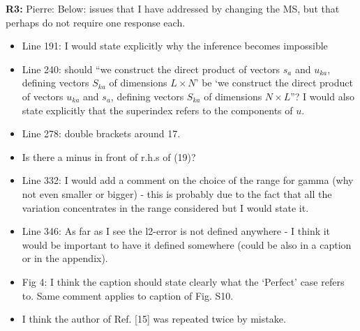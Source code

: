 \documentclass[aps,rmp,onecolumn]{revtex4-1}
\newcommand{\pierre}[1]{{\color{red}Pierre: #1}}
\newcommand{\refc}[1]{\textbf{R3:} #1\vskip 5mm}
\begin{document}
\refc{
	\pierre{Below: issues that I have addressed by changing the MS, but that perhaps do not require one response each.}
	\begin{itemize}
		\item Line 191: I would state explicitly why the inference becomes impossible
		\item Line 240: should ``we construct the direct product of vectors $s_{a}$ and $u_{ka}$, defining vectors $S_{ka}$ of dimensions $L \times N$’ be ‘we construct the direct product of vectors $u_{ka}$ and $s_{a}$, defining vectors $S_{ka}$ of dimensions $N \times L$''?
		I would also state explicitly that the superindex refers to the components of $u$.
		\item Line 278: double brackets around 17.
		\item Is there a minus in front of r.h.s of (19)?
		\item Line 332: I would add a comment on the choice of the range for gamma (why not even smaller or bigger) - this is probably due to the fact that all the variation concentrates in the range considered but I would state it.
		\item Line 346: As far as I see the l2-error is not defined anywhere - I think it would be important to have it defined somewhere (could be also in a caption or in the appendix).
		\item Fig 4: I think the caption should state clearly what the ‘Perfect’ case refers to. Same comment applies to caption of Fig. S10.
		\item I think the author of Ref. [15] was repeated twice by mistake.
	\end{itemize}
}
\end{document}
